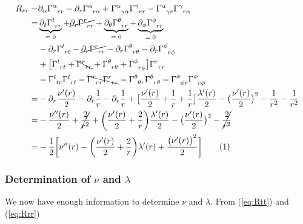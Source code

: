 \documentclass[]{article}
\newcommand\numberthis{\addtocounter{equation}{1}\tag{\theequation}}
\begin{document}
\begin{align*}
	R_{rr} =& \partial_\alpha \Gamma\indices{^\alpha_{rr}} - \partial_r \Gamma\indices{^\alpha_{r\alpha}} + \Gamma\indices{^\alpha_{\gamma\alpha}} \Gamma\indices{^\gamma_{rr}} - \Gamma\indices{^\alpha_{\gamma r}} \Gamma\indices{^\gamma_{r\alpha}}\\
	=& \underbrace{\partial_t \Gamma\indices{^t_{rr}}}_\text{$=0$} + \cancel{\partial_r \Gamma\indices{^r_{rr}} } +\underbrace{\partial_\theta \Gamma\indices{^\theta_{rr}}}_\text{$=0$} + \underbrace{\partial_\phi \Gamma\indices{^\phi_{rr}}}_\text{$=0$}\\
	&- \partial_r \Gamma\indices{^t_{rt}} - \cancel{\partial_r \Gamma\indices{^r_{rr}}} - \partial_r \Gamma\indices{^\theta_{r\theta}} - \partial_r \Gamma\indices{^\phi_{r\phi}}\\
	&+ \big[\Gamma\indices{^t_{rt}} + \bcancel{\Gamma\indices{^r_{rr}}} + \Gamma\indices{^\theta_{r\theta}}  + \Gamma\indices{^\phi_{r\phi}}\big] \Gamma\indices{^r_{rr}}\\
	&- \Gamma\indices{^t_{t r}} \Gamma\indices{^t_{rt}} - \bcancel{\Gamma\indices{^r_{r r}} \Gamma\indices{^r_{rr}}} - \Gamma\indices{^\theta_{\theta r}} \Gamma\indices{^\theta_{r\theta}} - \Gamma\indices{^\phi_{\phi r}} \Gamma\indices{^\phi_{r\phi}}\\
	=& - \partial_r \frac{\nu^\prime(r)}{2}  - \partial_r \frac{1}{r} - \partial_r \frac{1}{r} + \big[\frac{\nu^\prime(r)}{2}  + \frac{1}{r}  + \frac{1}{r}\big] \frac{\lambda^\prime(r)}{2}- \big(\frac{\nu^\prime(r)}{2}\big)^2 -  \frac{1}{r^2}  - \frac{1}{r^2}\\
	=& -\frac{\nu^{\prime\prime}(r)}{2} + \cancel{\frac{2}{r^2}} + \bigg(\frac{\nu^\prime(r)}{2}  + \frac{2}{r}  \bigg) \frac{\lambda^\prime(r)}{2}- \big(\frac{\nu^\prime(r)}{2}\big)^2 -  \cancel{\frac{2}{r^2}} \\
	=& -\frac{1}{2}\bigg[\nu^{\prime\prime}(r) - \bigg(\frac{\nu^\prime(r)}{2}  + \frac{2}{r}  \bigg) \lambda^\prime(r) + \frac{\big(\nu^\prime(r)\big)^2}{2}\bigg] \numberthis \label{eq:Rrr}
\end{align*}

\subsubsection{Determination of $\nu$ and $\lambda$}

We now have enough information to determine $\nu$ and $\lambda$. From (\ref{eq:Rtt}) and (\ref{eq:Rrr})
\end{document}
